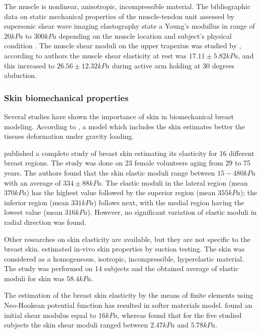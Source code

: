 The muscle is nonlinear, anisotropic, incompressible material.  The bibliographic data on static mechanical properties of the muscle-tendon unit assessed by supersonic shear wave imaging elastography state a Young's modullus in range of $20kPa$ to $300kPa$ depending on the muscle location and subject's physical condition \citep{lima_eassessment_2018}.  The muscle shear moduli on the upper trapezius was studied by \cite{leong_quantitative_2013}, according to authors the muscle shear elasticity at rest was $17.11\pm 5.82 kPa$, and this increased to $26.56\pm 12.32 kPa$ during active arm holding at 30 degrees abduction. 

\subsubsection*{Skin biomechanical properties}
Several studies have shown the importance of skin in biomechanical breast modeling. According to \cite{carter_biomechanical_2009}, a model which includes the skin estimates better the tissues deformation under gravity loading.

 \cite{sutradhar_vivo_2013} published a complete study of breast skin estimating its elasticity for 16 different breast regions. The study was done on 23 female volunteers aging from 29 to 75 years. The authors found that the skin elastic moduli range between $15-480 kPa$ with an average of $334\pm 88 kPa$. The elastic moduli in the lateral region (mean $370 kPa$) has the highest value followed by the superior region (mean $355 kPa$); the inferior region (mean $331 kPa$) follows next, with the medial region having the
lowest value (mean $316 kPa$). However, no significant variation of elastic moduli in radial direction was found. 
 
Other researches on skin elasticity are available, but they are not specific to the breast skin. \cite{hendriks_relative_2006} estimated in-vivo skin properties by suction testing. The skin was considered as a homogeneous, isotropic, incompressible, hyperelastic material. The study was performed on 14 subjects and the obtained average of elastic moduli for skin was $58.4 kPa$.

The estimation of the breast skin elasticity by the means of finite elements using Neo-Hookean potential function has resulted in softer materials model. \cite{carter_determining_2009} found an initial shear modulus equal to $16kPa$, whereas \cite{han_nonlinear_2014} found that for the five studied subjects the skin shear moduli ranged between $2.47 kPa$ and $5.78kPa$. 

